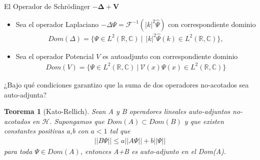 \documentclass[aspectratio=1610]{beamer}
\newcommand*{\field}[1]{\mathbb{#1}}
\newtheorem*{teo}{Teorema}
\begin{document}
\begin{frame}{El Operador de Schrödinger $\boldsymbol{-\Delta + V}$}

\begin{itemize}
    \item Sea el operador Laplaciano $-\Delta\Psi = \mathcal{F}^{-1}(|k|^{2} \hat{\Psi})$ con correspondiente dominio 
    \begin{align*} Dom(\Delta) = \{\Psi\in L^{2}(\field{R},\field{C}) \:|\:
       \: |k|^{2}\hat{\Psi}(k) \in L^{2}(\field{R},\field{C})\},
    \end{align*}
    \item Sea el operador Potencial $V$ es autoadjunto con correspondiente dominio
    \begin{align*}  Dom(V) = \{
        \Psi\in L^{2}(\field{R},\field{C})\:|\:\mathcal{V}(x)\Psi(x)\in L^{2}(\field{R},\field{C})
        \}
    \end{align*}
    
\end{itemize}
    
\end{frame}

\begin{frame}{¿Bajo qué condiciones garantizo que la suma de dos operadores no-acotados sea auto-adjunta?}

\vspace{0.03\textheight} 

\begin{teo}[Kato-Rellich]
    Sean  A y B operadores lineales auto-adjuntos no-acotados en $\mathcal{H}$. Supongamos que $Dom(A)\subset Dom(B)$ y que existen constantes positivas a,b con $a<1$ tal que
    \begin{align*}
        ||B\Psi|| \leq a||A\Psi|| + b||\Psi||
    \end{align*}
    para toda $\Psi\in Dom(A)$, entonces A+B es auto-adjunto en el Dom(A).
    \label{teo:K-R}
\end{teo}    
\end{frame}
\end{document}
